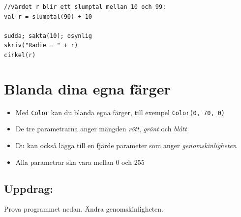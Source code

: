  

\begin{lstlisting}[basicstyle={\ttfamily\fontsize{20}{24}\selectfont},numbers=none]
//värdet r blir ett slumptal mellan 10 och 99:
val r = slumptal(90) + 10   

sudda; sakta(10); osynlig
skriv("Radie = " + r)
cirkel(r)
\end{lstlisting}
        
\chapter{Blanda dina egna färger}

\begin{itemize}

\item {Med \lstinline{Color} kan du blanda egna färger, till exempel \lstinline{Color(0, 70, 0)}}
\item {De tre parametrarna anger mängden {\it rött}, {\it grönt} och {\it blått}}
\item {Du kan också lägga till en fjärde parameter som anger {\it genomskinligheten}}
\item {Alla parametrar ska vara mellan 0 och 255}

\end{itemize}


\section*{\color{BrickRed}Uppdrag:}
Prova programmet nedan. Ändra genomskinligheten.

